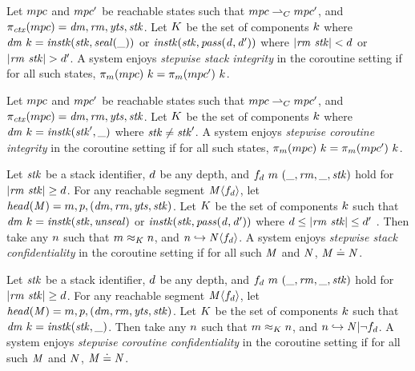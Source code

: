 \documentclass[acmsmall,review,anonymous]{acmart}\settopmatter{printfolios=true,printccs=false,printacmref=false}
\begin{document}
 Let \(mpc\) and \(mpc'\) be reachable states such that
\(mpc \overset{}{\rightharpoonup}_C mpc'\), and \(\pi_{\mathit{ctx}}(mpc) = \mathit{dm},\mathit{rm},\mathit{yts},\mathit{stk}\).
Let \(K\) be the set of components \(k\) where
\(\mathit{dm} ~ k = \mathit{instk}(\mathit{stk},\mathit{seal(\_)})\) or
\(\mathit{instk}(\mathit{stk},\mathit{pass(d,d')})\)
where \(|\mathit{rm} ~ \mathit{stk}| < d\) or \(|\mathit{rm} ~ \mathit{stk}| > d'\). A system enjoys
{\em stepwise stack integrity} in the coroutine setting if for all
such states, \(\pi_m(mpc) ~ k = \pi_m(mpc') ~ k\).

 Let \(mpc\) and \(mpc'\) be reachable states such that
\(mpc \overset{}{\rightharpoonup}_C mpc'\), and \(\pi_{\mathit{ctx}}(mpc) = \mathit{dm},\mathit{rm},\mathit{yts},\mathit{stk}\).
Let \(K\) be the set of components \(k\) where
\(\mathit{dm} ~ k = \mathit{instk}(\mathit{stk}',\_)\) where \(\mathit{stk} \not = \mathit{stk}'\).
A system enjoys {\em stepwise coroutine integrity} in the coroutine setting if for all
such states, \(\pi_m(mpc) ~ k = \pi_m(mpc') ~ k\).

 Let \(\mathit{stk}\) be a stack identifier, \(d\) be any depth, and
\(f_d ~ m ~ (\_, \mathit{rm}, \_, \mathit{stk})\) hold for \(|\mathit{rm} ~ \mathit{stk}| \geq d\).
For any reachable segment \(\mathit{M} \langle f_d \rangle\),
let \(\mathit{head}(\mathit{M}) = m,p,(\mathit{dm},\mathit{rm},\mathit{yts},\mathit{stk})\). Let
\(K\) be the set of components \(k\) such that
\(\mathit{dm} ~ k = \mathit{instk}(\mathit{stk},\mathit{unseal})\) or
\(\mathit{instk}(\mathit{stk},\mathit{pass(d,d')})\)
where \(d \leq |\mathit{rm} ~ \mathit{stk}| \leq d'\) .
Then take any \(n\) such that \(m \approx_K n\), and
\(n \hookrightarrow \mathit{N}\langle f_d \rangle\). A system enjoys
{\em stepwise stack confidentiality} in the coroutine setting if for all
such \(\mathit{M}\) and \(\mathit{N}\), \(\mathit{M} \doteq \mathit{N}\).

 Let \(\mathit{stk}\) be a stack identifier, \(d\) be any depth, and
\(f_d ~ m ~ (\_, \mathit{rm}, \_, \mathit{stk})\) hold for \(|\mathit{rm} ~ \mathit{stk}| \geq d\).
For any reachable segment \(\mathit{M} \langle f_d \rangle\),
let \(\mathit{head}(\mathit{M}) = m,p,(\mathit{dm},\mathit{rm},\mathit{yts},\mathit{stk})\). Let
\(K\) be the set of components \(k\) such that
\(\mathit{dm} ~ k = \mathit{instk}(\mathit{stk},\_)\).
Then take any \(n\) such that \(m \approx_K n\), and
\(n \hookrightarrow \mathit{N} | \neg f_d\). A system enjoys
{\em stepwise coroutine confidentiality} in the coroutine setting if for all
such \(\mathit{M}\) and \(\mathit{N}\), \(\mathit{M} \doteq \mathit{N}\).
\end{document}

